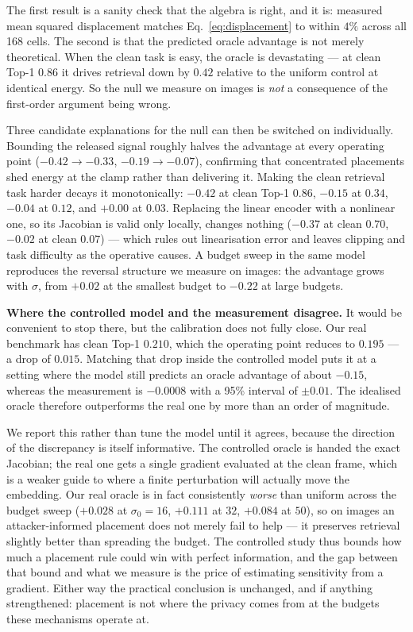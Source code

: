 \documentclass[10pt,journal]{IEEEtran}
\begin{document}
The first result is a sanity check that the algebra is right, and it is:
measured mean squared displacement matches Eq.~\eqref{eq:displacement} to
within $4\%$ across all 168 cells. The second is that the predicted oracle
advantage is not merely theoretical. When the clean task is easy, the oracle
is devastating --- at clean Top-1 $0.86$ it drives retrieval down by $0.42$
relative to the uniform control at identical energy. So the null we measure on
images is \emph{not} a consequence of the first-order argument being wrong.

Three candidate explanations for the null can then be switched on
individually. Bounding the released signal roughly halves the advantage at
every operating point ($-0.42 \rightarrow -0.33$, $-0.19 \rightarrow -0.07$),
confirming that concentrated placements shed energy at the clamp rather than
delivering it. Making the clean retrieval task harder decays it monotonically:
$-0.42$ at clean Top-1 $0.86$, $-0.15$ at $0.34$, $-0.04$ at $0.12$, and
$+0.00$ at $0.03$. Replacing the linear encoder with a nonlinear one, so its
Jacobian is valid only locally, changes nothing ($-0.37$ at clean $0.70$,
$-0.02$ at clean $0.07$) --- which rules out linearisation error and leaves
clipping and task difficulty as the operative causes. A budget sweep in the
same model reproduces the reversal structure we measure on images: the
advantage grows with $\sigma$, from $+0.02$ at the smallest budget to $-0.22$
at large budgets.

\textbf{Where the controlled model and the measurement disagree.} It would be
convenient to stop there, but the calibration does not fully close. Our real
benchmark has clean Top-1 $0.210$, which the operating point reduces to
$0.195$ --- a drop of $0.015$. Matching that drop inside the controlled model
puts it at a setting where the model still predicts an oracle advantage of
about $-0.15$, whereas the measurement is $-0.0008$ with a 95\% interval of
$\pm 0.01$. The idealised oracle therefore outperforms the real one by more
than an order of magnitude.

We report this rather than tune the model until it agrees, because the
direction of the discrepancy is itself informative. The controlled oracle is
handed the exact Jacobian; the real one gets a single gradient evaluated at
the clean frame, which is a weaker guide to where a finite perturbation will
actually move the embedding. Our real oracle is in fact consistently
\emph{worse} than uniform across the budget sweep ($+0.028$ at $\sigma_0=16$,
$+0.111$ at $32$, $+0.084$ at $50$), so on images an attacker-informed
placement does not merely fail to help --- it preserves retrieval slightly
better than spreading the budget. The controlled study thus bounds how much a
placement rule could win with perfect information, and the gap between that
bound and what we measure is the price of estimating sensitivity from a
gradient. Either way the practical conclusion is unchanged, and if anything
strengthened: placement is not where the privacy comes from at the budgets
these mechanisms operate at.
\end{document}
